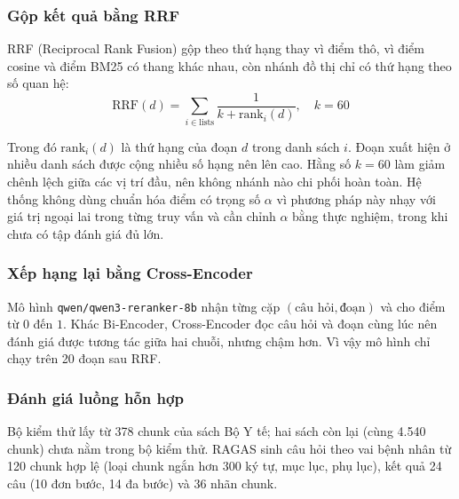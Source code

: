 \subsubsection{Gộp kết quả bằng RRF}

RRF (Reciprocal Rank Fusion) gộp theo thứ hạng thay vì điểm thô, vì điểm cosine và điểm BM25 có thang khác nhau, còn nhánh đồ thị chỉ có thứ hạng theo số quan hệ:
\begin{equation}
  \mathrm{RRF}(d)=\sum_{i\in \mathrm{lists}} \frac{1}{k+\mathrm{rank}_{i}(d)},\quad k=60
\end{equation}

Trong đó $\mathrm{rank}_i(d)$ là thứ hạng của đoạn $d$ trong danh sách $i$. Đoạn xuất hiện ở nhiều danh sách được cộng nhiều số hạng nên lên cao. Hằng số $k=60$ làm giảm chênh lệch giữa các vị trí đầu, nên không nhánh nào chi phối hoàn toàn. Hệ thống không dùng chuẩn hóa điểm có trọng số $\alpha$ vì phương pháp này nhạy với giá trị ngoại lai trong từng truy vấn và cần chỉnh $\alpha$ bằng thực nghiệm, trong khi chưa có tập đánh giá đủ lớn.


\subsubsection{Xếp hạng lại bằng Cross-Encoder}

Mô hình \texttt{qwen/qwen3-reranker-8b} nhận từng cặp $(\text{câu hỏi},\text{đoạn})$ và cho điểm từ $0$ đến $1$. Khác Bi-Encoder, Cross-Encoder đọc câu hỏi và đoạn cùng lúc nên đánh giá được tương tác giữa hai chuỗi, nhưng chậm hơn. Vì vậy mô hình chỉ chạy trên 20 đoạn sau RRF.


\subsubsection{Đánh giá luồng hỗn hợp}

Bộ kiểm thử lấy từ 378 chunk của sách Bộ Y tế; hai sách còn lại (cùng 4.540 chunk) chưa nằm trong bộ kiểm thử. RAGAS sinh câu hỏi theo vai bệnh nhân từ 120 chunk hợp lệ (loại chunk ngắn hơn 300 ký tự, mục lục, phụ lục), kết quả 24 câu (10 đơn bước, 14 đa bước) và 36 nhãn chunk.

